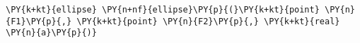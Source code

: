 \begin{Verbatim}[commandchars=\\\{\}]
    \PY{k+kt}{ellipse} \PY{n+nf}{ellipse}\PY{p}{(}\PY{k+kt}{point} \PY{n}{F1}\PY{p}{,} \PY{k+kt}{point} \PY{n}{F2}\PY{p}{,} \PY{k+kt}{real} \PY{n}{a}\PY{p}{)}
\end{Verbatim}
